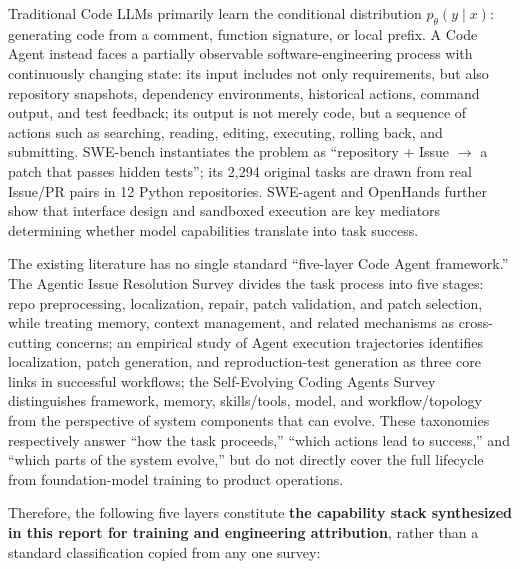 \documentclass[10pt,a4paper,UTF8,fontset=none]{ctexart}
\begin{document}
Traditional Code LLMs primarily learn the conditional distribution $p_\theta(y\mid x)$: generating code from a comment, function signature, or local prefix. A Code Agent instead faces a partially observable software-engineering process with continuously changing state: its input includes not only requirements, but also repository snapshots, dependency environments, historical actions, command output, and test feedback; its output is not merely code, but a sequence of actions such as searching, reading, editing, executing, rolling back, and submitting. SWE-bench instantiates the problem as ``repository + Issue $\rightarrow$ a patch that passes hidden tests''; its 2,294 original tasks are drawn from real Issue/PR pairs in 12 Python repositories\cite{en:jimenez2024swebench}. SWE-agent and OpenHands further show that interface design and sandboxed execution are key mediators determining whether model capabilities translate into task success\cite{en:yang2024sweagent,en:wang2024openhands}.

The existing literature has no single standard ``five-layer Code Agent framework.'' The Agentic Issue Resolution Survey divides the task process into five stages: repo preprocessing, localization, repair, patch validation, and patch selection, while treating memory, context management, and related mechanisms as cross-cutting concerns\cite{en:jiang2025agentsurvey}; an empirical study of Agent execution trajectories identifies localization, patch generation, and reproduction-test generation as three core links in successful workflows\cite{en:ceka2025traceability}; the Self-Evolving Coding Agents Survey distinguishes framework, memory, skills/tools, model, and workflow/topology from the perspective of system components that can evolve\cite{en:zhou2026selfevolving}. These taxonomies respectively answer ``how the task proceeds,'' ``which actions lead to success,'' and ``which parts of the system evolve,'' but do not directly cover the full lifecycle from foundation-model training to product operations.

Therefore, the following five layers constitute \textbf{the capability stack synthesized in this report for training and engineering attribution}, rather than a standard classification copied from any one survey:
\end{document}
